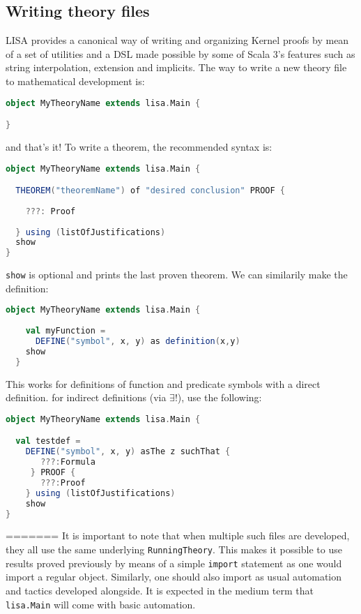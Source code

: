 \subsection{Writing theory files}
LISA provides a canonical way of writing and organizing Kernel proofs by mean of a set of utilities and a DSL made possible by some of Scala 3's features such as string interpolation, extension and implicits.
The way to write a new theory file to mathematical development is:
\begin{lstlisting}[language=Scala, frame=single]
object MyTheoryName extends lisa.Main {

}
\end{lstlisting}
and that's it! To write a theorem, the recommended syntax is:

\begin{lstlisting}[language=Scala, frame=single]
object MyTheoryName extends lisa.Main {

  THEOREM("theoremName") of "desired conclusion" PROOF {
    
    ???: Proof
    
  } using (listOfJustifications)
  show
}
\end{lstlisting}
\lstinline{show}{} is optional and prints the last proven theorem. We can similarily make the definition:

\noindent
\begin{minipage}{\textwidth}
  \begin{lstlisting}[language=Scala, frame=single]
  object MyTheoryName extends lisa.Main {
  
    val myFunction = 
      DEFINE("symbol", x, y) as definition(x,y)
    show
  }
  \end{lstlisting}
\end{minipage}
%
This works for definitions of function and predicate symbols with a direct definition. for indirect definitions (via $\exists !$), use the following:
%
\begin{lstlisting}[language=Scala, frame=single]
object MyTheoryName extends lisa.Main {

  val testdef =
    DEFINE("symbol", x, y) asThe z suchThat {
       ???:Formula
     } PROOF {
       ???:Proof
    } using (listOfJustifications)
    show
}
\end{lstlisting}


=======
It is important to note that when multiple such files are developed, they all use the same underlying \lstinline{RunningTheory}{}. This makes it possible to use results proved previously by means of a simple \lstinline{import}{} statement as one would import a regular object. Similarly, one should also import as usual automation and tactics developed alongside. It is expected in the medium term that \lstinline{lisa.Main}{} will come with basic automation.

